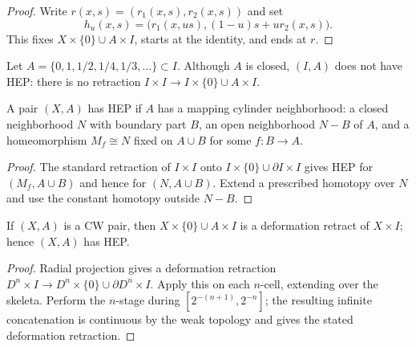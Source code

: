 \begin{proof}

\sketch Write $r(x,s)=(r_1(x,s),r_2(x,s))$ and set
\[
h_u(x,s)=\bigl(r_1(x,us),(1-u)s+u r_2(x,s)\bigr).
\]
This fixes $X\times\{0\}\cup A\times I$, starts at the identity, and ends at $r$.
\end{proof}

\begin{example}
\label{ex:hep-fails-for-bad-subspace}

Let $A=\{0,1,1/2,1/4,1/3,\ldots\}\subset I$. Although $A$ is closed, $(I,A)$
does not have HEP: there is no retraction
$I\times I\to I\times\{0\}\cup A\times I$.
\end{example}

\begin{example}
\label{ex:mapping-cylinder-neighborhood-hep}

A pair $(X,A)$ has HEP if $A$ has a mapping cylinder neighborhood: a closed
neighborhood $N$ with boundary part $B$, an open neighborhood $N-B$ of $A$, and a
homeomorphism $M_f\cong N$ fixed on $A\cup B$ for some $f:B\to A$.
\end{example}

\begin{proof}
\sketch The standard retraction of $I\times I$ onto
$I\times\{0\}\cup\partial I\times I$ gives HEP for $(M_f,A\cup B)$ and hence for
$(N,A\cup B)$. Extend a prescribed homotopy over $N$ and use the constant homotopy
outside $N-B$.
\end{proof}

\begin{proposition}
\label{prop:cw-pairs-have-hep}



If $(X,A)$ is a CW pair, then
$X\times\{0\}\cup A\times I$ is a deformation retract of $X\times I$; hence
$(X,A)$ has HEP.
\end{proposition}

\begin{proof}

\sketch Radial projection gives a deformation retraction
$D^n\times I\to D^n\times\{0\}\cup\partial D^n\times I$. Apply this on each
$n$-cell, extending over the skeleta. Perform the $n$-stage during
$[2^{-(n+1)},2^{-n}]$; the resulting infinite concatenation is continuous by the
weak topology and gives the stated deformation retraction.
\end{proof}

